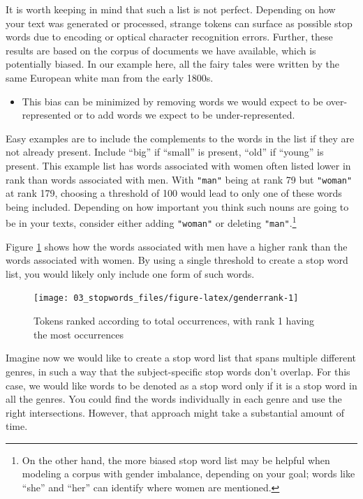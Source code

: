 \documentclass[
]{krantz}
\newenvironment{rmdblock}[1]
  {\begin{shaded*}
  \begin{itemize}[left = -1cm, labelsep = 1cm]
  \renewcommand{\labelitemi}{
    \raisebox{-.7\height}[0pt][0pt]{
      {\setkeys{Gin}{width=3em,keepaspectratio}\texttt{[image: images/\#1]}}
    }
  }
 
  \item
  }
  {
  \end{itemize}
  \end{shaded*}
  }
\newenvironment{rmdnote}
  {\begin{rmdblock}{note}}
  {\end{rmdblock}}
\begin{document}
It is worth keeping in mind that such a list is not perfect. Depending on how your text was generated or processed, strange tokens can surface as possible stop words due to encoding or optical character recognition errors. Further, these results are based on the corpus of documents we have available, which is potentially biased. In our example here, all the fairy tales were written by the same European white man from the early 1800s.

\begin{rmdnote}
This bias can be minimized by removing words we would expect to be
over-represented or to add words we expect to be under-represented.
\end{rmdnote}

Easy examples are to include the complements to the words in the list if they are not already present. Include ``big'' if ``small'' is present, ``old'' if ``young'' is present. This example list has words associated with women often listed lower in rank than words associated with men. With \texttt{"man"} being at rank 79 but \texttt{"woman"} at rank 179, choosing a threshold of 100 would lead to only one of these words being included. Depending on how important you think such nouns are going to be in your texts, consider either adding \texttt{"woman"} or deleting \texttt{"man"}.\footnote{On the other hand, the more biased stop word list may be helpful when modeling a corpus with gender imbalance, depending on your goal; words like ``she'' and ``her'' can identify where women are mentioned.}

Figure \ref{fig:genderrank} shows how the words associated with men have a higher rank than the words associated with women. By using a single threshold to create a stop word list, you would likely only include one form of such words.

\begin{figure}

{\centering \texttt{[image: 03\_stopwords\_files/figure-latex/genderrank-1]} 

}

\caption{Tokens ranked according to total occurrences, with rank 1 having the most occurrences}\label{fig:genderrank}
\end{figure}

Imagine now we would like to create a stop word list that spans multiple different genres, in such a way that the subject-specific stop words don't overlap. For this case, we would like words to be denoted as a stop word only if it is a stop word in all the genres. You could find the words individually in each genre and use the right intersections. However, that approach might take a substantial amount of time.
\end{document}
